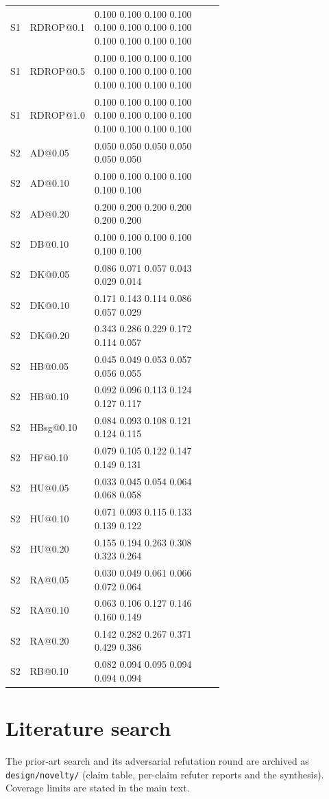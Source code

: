 \documentclass[11pt]{article}
\begin{document}
\begin{longtable}{ll p{0.62\linewidth}}
S1 & RDROP@0.1 & 0.100 0.100 0.100 0.100 0.100 0.100 0.100 0.100 0.100 0.100 0.100 0.100\\
S1 & RDROP@0.5 & 0.100 0.100 0.100 0.100 0.100 0.100 0.100 0.100 0.100 0.100 0.100 0.100\\
S1 & RDROP@1.0 & 0.100 0.100 0.100 0.100 0.100 0.100 0.100 0.100 0.100 0.100 0.100 0.100\\
S2 & AD@0.05 & 0.050 0.050 0.050 0.050 0.050 0.050\\
S2 & AD@0.10 & 0.100 0.100 0.100 0.100 0.100 0.100\\
S2 & AD@0.20 & 0.200 0.200 0.200 0.200 0.200 0.200\\
S2 & DB@0.10 & 0.100 0.100 0.100 0.100 0.100 0.100\\
S2 & DK@0.05 & 0.086 0.071 0.057 0.043 0.029 0.014\\
S2 & DK@0.10 & 0.171 0.143 0.114 0.086 0.057 0.029\\
S2 & DK@0.20 & 0.343 0.286 0.229 0.172 0.114 0.057\\
S2 & HB@0.05 & 0.045 0.049 0.053 0.057 0.056 0.055\\
S2 & HB@0.10 & 0.092 0.096 0.113 0.124 0.127 0.117\\
S2 & HBsg@0.10 & 0.084 0.093 0.108 0.121 0.124 0.115\\
S2 & HF@0.10 & 0.079 0.105 0.122 0.147 0.149 0.131\\
S2 & HU@0.05 & 0.033 0.045 0.054 0.064 0.068 0.058\\
S2 & HU@0.10 & 0.071 0.093 0.115 0.133 0.139 0.122\\
S2 & HU@0.20 & 0.155 0.194 0.263 0.308 0.323 0.264\\
S2 & RA@0.05 & 0.030 0.049 0.061 0.066 0.072 0.064\\
S2 & RA@0.10 & 0.063 0.106 0.127 0.146 0.160 0.149\\
S2 & RA@0.20 & 0.142 0.282 0.267 0.371 0.429 0.386\\
S2 & RB@0.10 & 0.082 0.094 0.095 0.094 0.094 0.094\\
\bottomrule\end{longtable}
\section{Literature search}
The prior-art search and its adversarial refutation round are archived as \texttt{design/novelty/} (claim table, per-claim refuter reports and the synthesis). Coverage limits are stated in the main text.
\end{document}
